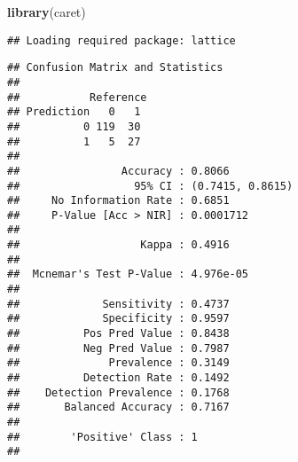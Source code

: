 \documentclass[]{article}
\newenvironment{Shaded}{\begin{snugshade}}{\end{snugshade}}
\newcommand{\DataTypeTok}[1]{\textcolor[rgb]{0.13,0.29,0.53}{#1}}
\newcommand{\KeywordTok}[1]{\textcolor[rgb]{0.13,0.29,0.53}{\textbf{#1}}}
\newcommand{\NormalTok}[1]{#1}
\newcommand{\OperatorTok}[1]{\textcolor[rgb]{0.81,0.36,0.00}{\textbf{#1}}}
\newcommand{\StringTok}[1]{\textcolor[rgb]{0.31,0.60,0.02}{#1}}
\begin{document}
\begin{Shaded}
\begin{Highlighting}[]
\KeywordTok{library}\NormalTok{(caret)}
\end{Highlighting}
\end{Shaded}

\begin{verbatim}
## Loading required package: lattice
\end{verbatim}

\begin{Shaded}
\end{Shaded}

\begin{verbatim}
## Confusion Matrix and Statistics
## 
##           Reference
## Prediction   0   1
##          0 119  30
##          1   5  27
##                                           
##                Accuracy : 0.8066          
##                  95% CI : (0.7415, 0.8615)
##     No Information Rate : 0.6851          
##     P-Value [Acc > NIR] : 0.0001712       
##                                           
##                   Kappa : 0.4916          
##                                           
##  Mcnemar's Test P-Value : 4.976e-05       
##                                           
##             Sensitivity : 0.4737          
##             Specificity : 0.9597          
##          Pos Pred Value : 0.8438          
##          Neg Pred Value : 0.7987          
##              Prevalence : 0.3149          
##          Detection Rate : 0.1492          
##    Detection Prevalence : 0.1768          
##       Balanced Accuracy : 0.7167          
##                                           
##        'Positive' Class : 1               
## 
\end{verbatim}

\begin{Shaded}
\end{Shaded}
\end{document}
